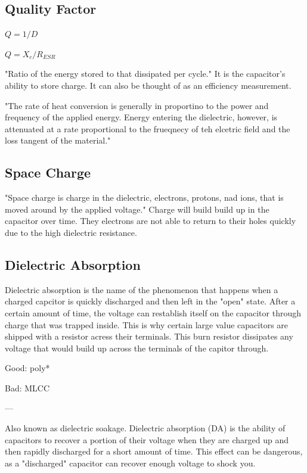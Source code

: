 \subsection{Quality Factor}

$Q = 1/D$

$Q = X_c / R_{ESR}$

"Ratio of the energy stored to that dissipated per cycle." It is the capacitor's ability to store charge. It can also be thought of as an efficiency measurement. 

"The rate of heat conversion is generally in proportino to the power and frequency of the applied energy. Energy entering the dielectric, however, is attenuated at a rate proportional to the frueqnecy of teh elcetric field and the loss tangent of the material."
\cite[Sect.~3.6.7]{elec_inv}

\subsection{Space Charge}

"Space charge is charge in the dielectric, electrons, protons, nad ions, that is moved around by the applied voltage." Charge will build build up in the capacitor over time. They electrons are not able to return to their holes quickly due to the high dielectric resistance.


\cite[Space Charge]{capSite_intro}

\subsection{Dielectric Absorption}

Dielectric absorption is the name of the phenomenon that happens when a charged capcitor is quickly discharged and then left in the "open" state. After a certain amount of time, the voltage can restablish itself on the capacitor through charge that was trapped inside. This is why certain large value capacitors are shipped with a resistor acress their terminals. This burn resistor dissipates any voltage that would build up across the terminals of the capitor through.

Good:
poly*

Bad:
MLCC

---

Also known as dielectric soakage. Dielectric absorption (DA) is the ability of capacitors to recover a portion of their voltage when they are charged up and then rapidly discharged for a short amount of time. This effect can be dangerous, as a "discharged" capacitor can recover enough voltage to shock you.\cite{rap_da}

